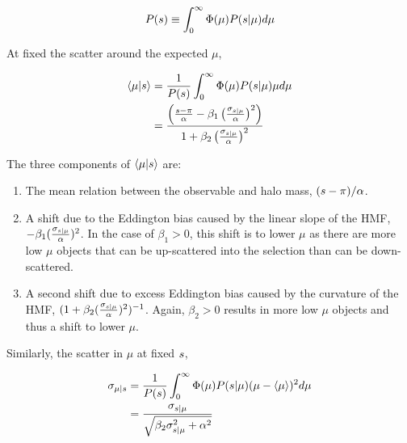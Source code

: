 \documentclass[fleqn,usenatbib,useAMS,english]{mnras}
\begin{document}
    \begin{equation}
        P(s{}) \equiv \int_{0}^{\infty} \Phi(\mu){} P(s{} | \mu) d\mu
    \end{equation}

    At fixed \obsSym{} the scatter around the expected $\mu$,

    \begin{equation}
    \begin{aligned}
        \langle \mu | s \rangle
        &= \frac{1}{P(s)}
            \int_{0}^{\infty} \Phi(\mu){} P(s{} | \mu) \mu d\mu \\
        &= \frac{\left( \frac{s- \pi}{\alpha} - \beta_1 \left(\frac{\sigma_{s{} | \mu{}}}{\alpha}\right)^2 \right)}{ 1 + \beta_2 \left(\frac{\sigma_{s{} | \mu{}}}{\alpha}\right)^2}
        \label{eq:mean_of_mu}
    \end{aligned}
    \end{equation}

    \noindent The three components of $\langle \mu | s \rangle$ are:

    \begin{enumerate}

        \item The mean relation between the observable and halo mass, $(s- \pi) /
        \alpha$.

        \item A shift due to the Eddington bias caused by the linear slope of the HMF, $-\beta_1
        (\frac{\sigma_{s{} | \mu{}}}{\alpha})^2$. In the case of $\beta_1 > 0$, this shift is to
        lower $\mu$ as there are more low $\mu$ objects that can be up-scattered into the
        selection than can be down-scattered.

        \item A second shift due to excess Eddington bias caused by the curvature of the HMF, $(1
        + \beta_2 (\frac{\sigma_{s{} | \mu{}}}{\alpha})^2)^{-1}$. Again, $\beta_2 > 0$ results in
        more low $\mu$ objects and thus a shift to lower $\mu$.

    \end{enumerate}

    Similarly, the scatter in $\mu$ at fixed $s$,

    \begin{equation}
    \begin{aligned}
        \sigma_{\mu{} | s{}}{}
        &= \frac{1}{P(s{})}
            \int_{0}^{\infty} \Phi(\mu){} P(s{} | \mu) ( \mu  - \langle \mu \rangle )^2 d\mu \\
    	&= \frac{\sigma_{s{} | \mu{}}}{\sqrt{\beta_2 \sigma_{s{} | \mu{}}^2 + \alpha^2}}
        \label{eq:scatter_of_mu}
    \end{aligned}
    \end{equation}
\end{document}

